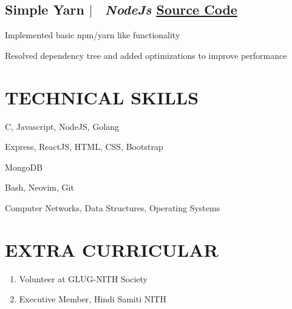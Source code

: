 \documentclass[11pt]{article}
\begin{document}
\subsection*{
  Simple Yarn
  $|$ 
  \normalsize \normalfont \ \textit{NodeJs}
  \hfill 
  \normalsize \underline{\href{https://github.com/HARSH-SHETH/simple_yarn}{Source Code}}
}
  \begin{description}
    \setlength{\itemsep}{0em}
    \setlength{\itemindent}{2\parindent}
    \item[$\bullet$]{Implemented basic npm/yarn like functionality}
    \item[$\bullet$]{Resolved dependency tree and added optimizations to improve performance} 
  \end{description}



\section{TECHNICAL SKILLS}
\begin{description}
  \setlength{\itemindent}{\parindent}
  \setlength{\itemsep}{0em}
  \item[Languages:]{C, Javascript, NodeJS, Golang}
  \item[Web Technologies:]{Express, ReactJS, HTML, CSS, Bootstrap}
  \item[Database:]{MongoDB}
  \item[Tools:]{Bash, Neovim, Git}
  \item[Coursework:]{Computer Networks, Data Structures,  Operating Systems}
\end{description}


\section{EXTRA CURRICULAR}
\begin{enumerate}
  \setlength{\itemsep}{0em}
  \item Volunteer at GLUG-NITH Society
  \item Executive Member, Hindi Samiti NITH
\end{enumerate}
\end{document}
